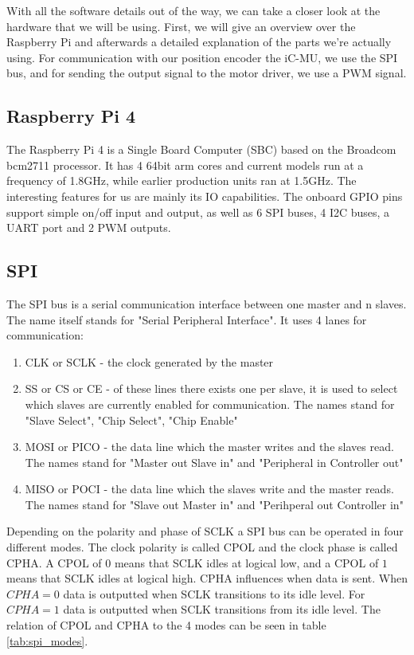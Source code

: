 With all the software details out of the way, we can take a closer look at the hardware that we will be using.
First, we will give an overview over the Raspberry Pi and afterwards a detailed explanation of the parts we're actually using.
For communication with our position encoder the iC-MU, we use the SPI bus, and for sending the output signal to the motor driver, we use a PWM signal.

\subsection{Raspberry Pi 4}
\label{sec:background:hardware:pi}

The Raspberry Pi 4 is a Single Board Computer (SBC) based on the Broadcom bcm2711 processor.
It has 4 64bit arm cores and current models run at a frequency of 1.8GHz, while earlier production units ran at 1.5GHz.
The interesting features for us are mainly its IO capabilities.
The onboard GPIO pins support simple on/off input and output, as well as 6 SPI buses, 4 I2C buses, a UART port and 2 PWM outputs.

\subsection{SPI}
\label{sec:background:hardware:spi}

The SPI bus is a serial communication interface between one master and n slaves.
The name itself stands for "Serial Peripheral Interface".
It uses 4 lanes for communication\cite[p. 220]{SensornetzwerkeInTheorieUndPraxis}:

\begin{enumerate}
    \item CLK or SCLK - the clock generated by the master
    \item SS or CS or CE - of these lines there exists one per slave, it is used to select which slaves are currently enabled for communication. The names stand for "Slave Select", "Chip Select", "Chip Enable"
    \item MOSI or PICO - the data line which the master writes and the slaves read. The names stand for "Master out Slave in" and "Peripheral in Controller out"
    \item MISO or POCI - the data line which the slaves write and the master reads. The names stand for "Slave out Master in" and "Perihperal out Controller in"
\end{enumerate}

Depending on the polarity and phase of SCLK a SPI bus can be operated in four different modes.
The clock polarity is called CPOL and the clock phase is called CPHA.
A CPOL of $0$ means that SCLK idles at logical low, and a CPOL of $1$ means that SCLK idles at logical high.
CPHA influences when data is sent.
When $CPHA = 0$ data is outputted when SCLK transitions to its idle level.
For $CPHA = 1$ data is outputted when SCLK transitions from its idle level.
The relation of CPOL and CPHA to the 4 modes can be seen in table \ref{tab:spi_modes}.

